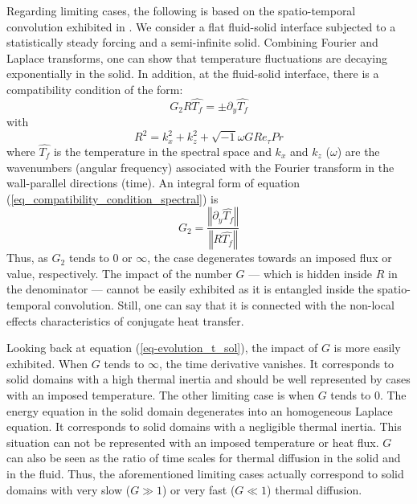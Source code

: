 \documentclass{svjour3}                     %
\begin{document}
Regarding limiting cases, the following is based on the spatio-temporal convolution exhibited in \cite{flageul2015dns}.
We consider a flat fluid-solid interface subjected to a statistically steady forcing and a semi-infinite solid.
Combining Fourier and Laplace transforms, one can show that temperature fluctuations are decaying exponentially in the solid.
In addition, at the fluid-solid interface, there is a compatibility condition of the form:
\begin{equation}
G_2 R \widehat{T_f} = \pm \partial_y \widehat{T_f}
\label{eq_compatibility_condition_spectral}
\end{equation}
with
\begin{equation}
R^2 = k_x^2 + k_z^2 + \sqrt{-1} \omega G Re_\tau Pr
\end{equation}
where $\widehat{T_f}$ is the temperature in the spectral space and $k_x$ and $k_z$ ($\omega$) are the wavenumbers (angular frequency) associated with the Fourier transform in the wall-parallel directions (time).
An integral form of equation (\ref{eq_compatibility_condition_spectral}) is
\begin{equation}
G_2 = \frac{ \left\Vert \partial_y \widehat{T_f} \right\Vert }{ \left\Vert R \widehat{T_f} \right \Vert }
\end{equation}
Thus, as $G_2$ tends to $0$ or $\infty$, the case degenerates towards an imposed flux or value, respectively.
The impact of the number $G$ --- which is hidden inside $R$ in the denominator --- cannot be easily exhibited as it is entangled inside the spatio-temporal convolution.
Still, one can say that it is connected with the non-local effects characteristics of conjugate heat transfer.

Looking back at equation (\ref{eq-evolution_t_sol}), the impact of $G$ is more easily exhibited.
When $G$ tends to $\infty$, the time derivative vanishes.
It corresponds to solid domains with a high thermal inertia and should be well represented by cases with an imposed temperature.
The other limiting case is when $G$ tends to $0$.
The energy equation in the solid domain degenerates into an homogeneous Laplace equation.
It corresponds to solid domains with a negligible thermal inertia.
This situation can not be represented with an imposed temperature or heat flux.
$G$ can also be seen as the ratio of time scales for thermal diffusion in the solid and in the fluid.
Thus, the aforementioned limiting cases actually correspond to solid domains with very slow ($G \gg 1$) or very fast ($G \ll 1$) thermal diffusion.
\end{document}

